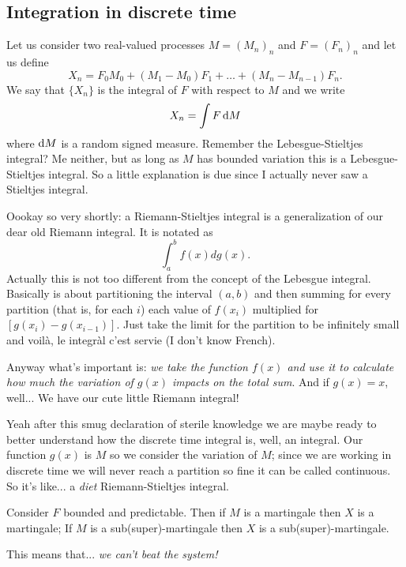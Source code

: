 \documentclass{report}
\begin{document}
\subsection{Integration in discrete time}
Let us consider two real-valued processes $M={(M_{n})}_{n}$ and $F={(F_{n})}_{n}$ and let us define
\[X_{n}=F_0M_{0}+(M_1-M_0)F_1+\ldots+(M_{n}-M_{n-1})F_n.\]
We say that $\{X_{n}\}$ is the integral of $F$ with respect to $M$ and we write
\[X_{n}=\int F \mathop{}\!\mathrm{d} M\]
where $\mathop{}\!\mathrm{d} M$ is a random signed measure. Remember the Lebesgue-Stieltjes integral? Me neither, but as long as $M$ has bounded variation this is a Lebesgue-Stieltjes integral. So a little explanation is due since I actually never saw a Stieltjes integral.
\begin{revise}
	Oookay so very shortly: a Riemann-Stieltjes integral is a generalization of our dear old Riemann integral. It is notated as
	\begin{equation*}
		\int_{a}^{b}f(x)dg(x).
	\end{equation*}
	Actually this is not too different from the concept of the Lebesgue integral. Basically is about partitioning the interval $(a,b)$ and then summing for every partition (that is, for each $i$) each value of $f(x_i)$ multiplied for $[g(x_i)-g(x_{i-1})]$. Just take the limit for the partition to be infinitely small and voilà, le integràl c'est servie (I don't know French).\par
	Anyway what's important is: \textit{we take the function $f(x)$ and use it to calculate how much the variation of $g(x)$ impacts on the total sum}. And if $g(x)=x$, well... We have our cute little Riemann integral!
\end{revise}
Yeah after this smug declaration of sterile knowledge we are maybe ready to better understand how the discrete time integral is, well, an integral. Our function $g(x)$ is $M$ so we consider the variation of $M$; since we are working in discrete time we will never reach a partition so fine it can be called continuous. So it's like... a \textit{diet} Riemann-Stieltjes integral.
\begin{theorem}
	Consider $F$ bounded and predictable. Then if $M$ is a martingale then $X$ is a martingale; If $M$ is a sub(super)-martingale then $X$ is a sub(super)-martingale.
\end{theorem}
This means that... \emph{we can't beat the system!}
	\begin{flushright}
	\hspace*{2.5cm}
\end{flushright}
\end{document}

